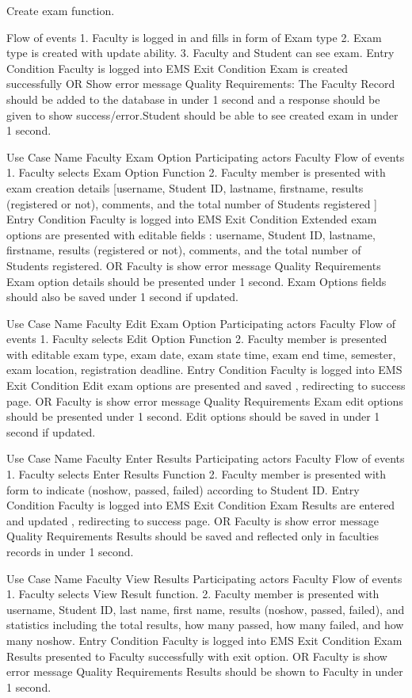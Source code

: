 Create exam function.

Flow of events	
1. Faculty is logged in and fills in form of Exam type
2. Exam type is created with update ability.
3. Faculty and Student can see exam.
Entry Condition	Faculty is logged into EMS
Exit Condition	Exam is created successfully
OR 
Show error message
Quality Requirements:	The Faculty Record should be added to the database in under 1 second and a response should be given to show success/error.Student should be able to see created exam in under 1 second.
	
	
Use Case Name	Faculty Exam Option
Participating actors	 Faculty
Flow of events	
1. Faculty selects Exam Option Function
2. Faculty member is presented with exam creation details [username, Student ID, lastname, firstname, results (registered or not), comments, and the total number of Students registered ]
Entry Condition	Faculty is logged into EMS
Exit Condition	Extended exam options are presented with editable fields : username, Student ID, lastname, firstname, results (registered or not), comments, and the total number of Students registered.
OR
Faculty is show error message 
Quality Requirements	Exam option details should be presented under 1 second. Exam Options fields should also be saved under 1 second if updated.
	
Use Case Name	Faculty Edit Exam Option
Participating actors	 Faculty
Flow of events	
1. Faculty selects Edit Option Function
2. Faculty member is presented with editable exam type, exam date, exam state time, exam end time, semester, exam location, registration deadline. 
Entry Condition	Faculty is logged into EMS
Exit Condition	Edit exam options are presented and saved  , redirecting to success page.
OR
Faculty is show error message 
Quality Requirements	Exam edit options should be presented under 1 second. Edit options should be saved in under 1 second if updated.
	
	
Use Case Name	Faculty Enter Results
Participating actors	 Faculty
Flow of events	
1. Faculty selects Enter Results Function
2. Faculty member is presented with form to indicate (noshow, passed, failed) according to Student ID. 
Entry Condition	Faculty is logged into EMS
Exit Condition	Exam Results are entered and updated , redirecting to success page.
OR
Faculty is show error message 
Quality Requirements	Results should be saved and reflected only in faculties records in under 1 second.
	
Use Case Name	Faculty View Results
Participating actors	 Faculty
Flow of events	
1. Faculty selects View Result function.
2. Faculty member is presented with username, Student ID, last name, first name, results (noshow, passed, failed), and statistics including the total results, how many passed, how many failed, and how many noshow. 
Entry Condition	Faculty is logged into EMS
Exit Condition	Exam Results presented to Faculty successfully with exit option.
OR
Faculty is show error message 
Quality Requirements	Results should be shown to Faculty in under 1 second.
	
